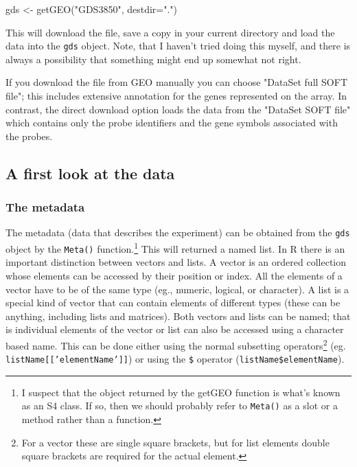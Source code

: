 \documentclass[11pt]{article}
\begin{document}
\begin{rcode}
  gds <- getGEO("GDS3850", destdir=".")
\end{rcode}
This will download the file, save a copy in your current directory
and load the data into the \texttt{gds} object. Note, that I haven't
tried doing this myself, and there is always a possibility that something
might end up somewhat not right.

If you download the file from GEO manually you can choose "DataSet full SOFT file";
this includes extensive annotation for the genes represented on the array.
In contrast, the direct download option loads the data from the "DataSet SOFT file"
which contains only the probe identifiers and the gene symbols associated
with the probes.

\subsection{A first look at the data}
\label{sec-1-2}
\subsubsection{The metadata}
\label{sec-1-2-1}
The metadata (data that describes the experiment) can be obtained from the
\texttt{gds} object by the \texttt{Meta()} function.\footnote{I suspect that
the object returned by the getGEO function is what's known as an S4 class.
If so, then we should probably refer to \texttt{Meta()} as a slot or a method
rather than a function.} This will returned a named list. In R there is
an important distinction between vectors and lists. A vector is an ordered
collection whose elements can be accessed by their position or index. All
the elements of a vector have to be of the same type (eg., numeric, logical,
or character). A list is a special kind of vector that can contain
elements of different types (these can be anything, including lists and matrices).
Both vectors and lists can be named; that is individual elements of the vector
or list can also be accessed using a character based name. This can be done
either using the normal subsetting operators\footnote{For a vector these are
single square brackets, but for list elements double square brackets are required
for the actual element.} (eg. \texttt{listName[['elementName']]}) or
using the \texttt{\$} operator (\texttt{listName\$elementName}).
\end{document}
